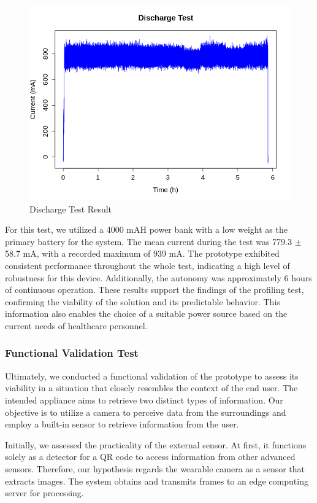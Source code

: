 \begin{figure}[!h]
    \centering
    \includegraphics[width = .6\linewidth]{Figures/discharge.png}
    \caption{Discharge Test Result}
    \label{fig:discharge}
\end{figure}

For this test, we utilized a 4000 mAH power bank with a low weight as the primary battery for the system. The mean current during the test was 779.3 $ \pm $ 58.7 mA, with a recorded maximum of 939 mA. The prototype exhibited consistent performance throughout the whole test, indicating a high level of robustness for this device. Additionally, the autonomy was approximately 6 hours of continuous operation. These results support the findings of the profiling test, confirming the viability of the solution and its predictable behavior. This information also enables the choice of a suitable power source based on the current needs of healthcare personnel.

\subsubsection{Functional Validation Test}

Ultimately, we conducted a functional validation of the prototype to assess its viability in a situation that closely resembles the context of the end user. The intended appliance aims to retrieve two distinct types of information. Our objective is to utilize a camera to perceive data from the surroundings and employ a built-in sensor to retrieve information from the user.

Initially, we assessed the practicality of the external sensor. At first, it functions solely as a detector for a QR code to access information from other advanced sensors. Therefore, our hypothesis regards the wearable camera as a sensor that extracts images. The system obtains and transmits frames to an edge computing server for processing.

